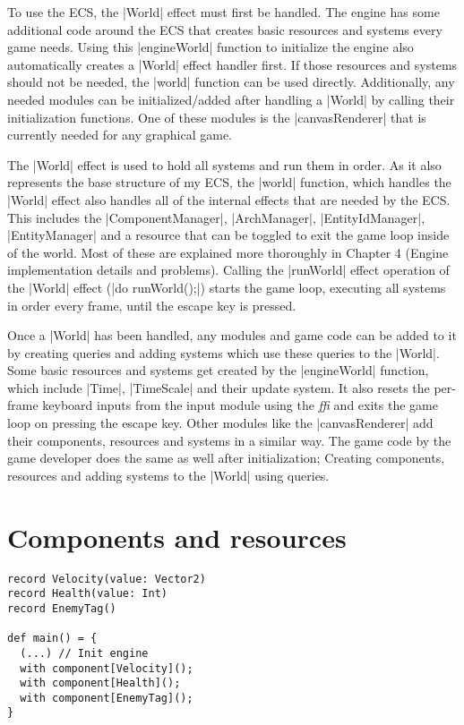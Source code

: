 To use the ECS, the |World| effect must first be handled. The engine has some additional code around the ECS that creates basic resources and systems every game needs. Using this |engineWorld| function to initialize the engine also automatically creates a |World| effect handler first. If those resources and systems should not be needed, the |world| function can be used directly. Additionally, any needed modules can be initialized/added after handling a |World| by calling their initialization functions. One of these modules is the |canvasRenderer| that is currently needed for any graphical game.

The |World| effect is used to hold all systems and run them in order. As it also represents the base structure of my ECS, the |world| function, which handles the |World| effect also handles all of the internal effects that are needed by the ECS. This includes the |ComponentManager|, |ArchManager|, |EntityIdManager|, |EntityManager| and a resource that can be toggled to exit the game loop inside of the world. Most of these are explained more thoroughly in Chapter 4 (Engine implementation details and problems). Calling the |runWorld| effect operation of the |World| effect (|do runWorld();|) starts the game loop, executing all systems in order every frame, until the escape key is pressed.

Once a |World| has been handled, any modules and game code can be added to it by creating queries and adding systems which use these queries to the |World|. Some basic resources and systems get created by the |engineWorld| function, which include |Time|, |TimeScale| and their update system. It also resets the per-frame keyboard inputs from the input module using the \textit{ffi} and exits the game loop on pressing the escape key. Other modules like the |canvasRenderer| add their components, resources and systems in a similar way. The game code by the game developer does the same as well after initialization; Creating components, resources and adding systems to the |World| using queries.

\section{Components and resources}

\begin{lstlisting}[caption=Register components example]
record Velocity(value: Vector2)
record Health(value: Int)
record EnemyTag()

def main() = {
  (...) // Init engine
  with component[Velocity]();
  with component[Health]();
  with component[EnemyTag]();
}
\end{lstlisting}

